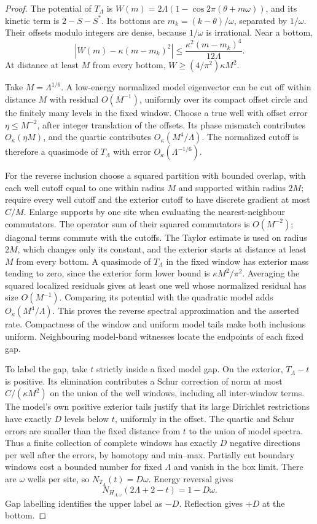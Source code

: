 \begin{proof}
The potential of $T_\Lambda$ is $W(m)=2\Lambda(1-\cos2\pi(\theta+m\omega))$, and its kinetic term is $2-S-S^*$. Its bottoms are $m_k=(k-\theta)/\omega$, separated by $1/\omega$. Their offsets modulo integers are dense, because $1/\omega$ is irrational. Near a bottom,
\[
 |W(m)-\kappa(m-m_k)^2|
 \le\frac{\kappa^2(m-m_k)^4}{12\Lambda}.
\]
At distance at least $M$ from every bottom, $W\ge(4/\pi^2)\kappa M^2$.

Take $M=\Lambda^{1/6}$. A low-energy normalized model eigenvector can be cut off within distance $M$ with residual $O(M^{-1})$, uniformly over its compact offset circle and the finitely many levels in the fixed window. Choose a true well with offset error $\eta\le M^{-2}$, after integer translation of the offsets. Its phase mismatch contributes $O_\kappa(\eta M)$, and the quartic contributes $O_\kappa(M^4/\Lambda)$. The normalized cutoff is therefore a quasimode of $T_\Lambda$ with error $O_\kappa(\Lambda^{-1/6})$.

For the reverse inclusion choose a squared partition with bounded overlap, with each well cutoff equal to one within radius $M$ and supported within radius $2M$; require every well cutoff and the exterior cutoff to have discrete gradient at most $C/M$. Enlarge supports by one site when evaluating the nearest-neighbour commutators. The operator sum of their squared commutators is $O(M^{-2})$; diagonal terms commute with the cutoffs. The Taylor estimate is used on radius $2M$, which changes only its constant, and the exterior starts at distance at least $M$ from every bottom. A quasimode of $T_\Lambda$ in the fixed window has exterior mass tending to zero, since the exterior form lower bound is $\kappa M^2/\pi^2$. Averaging the squared localized residuals gives at least one well whose normalized residual has size $O(M^{-1})$. Comparing its potential with the quadratic model adds $O_\kappa(M^4/\Lambda)$. This proves the reverse spectral approximation and the asserted rate. Compactness of the window and uniform model tails make both inclusions uniform. Neighbouring model-band witnesses locate the endpoints of each fixed gap.

To label the gap, take $t$ strictly inside a fixed model gap. On the exterior, $T_\Lambda-t$ is positive. Its elimination contributes a Schur correction of norm at most $C/(\kappa M^2)$ on the union of the well windows, including all inter-window terms. The model's own positive exterior tails justify that its large Dirichlet restrictions have exactly $D$ levels below $t$, uniformly in the offset. The quartic and Schur errors are smaller than the fixed distance from $t$ to the union of model spectra. Thus a finite collection of complete windows has exactly $D$ negative directions per well after the errors, by homotopy and min--max. Partially cut boundary windows cost a bounded number for fixed $\Lambda$ and vanish in the box limit. There are $\omega$ wells per site, so $N_{T_\Lambda}(t)=D\omega$. Energy reversal gives
\[
 N_{H_{\Lambda,\omega}}(2\Lambda+2-t)=1-D\omega.
\]
Gap labelling identifies the upper label as $-D$. Reflection gives $+D$ at the bottom.
\end{proof}

